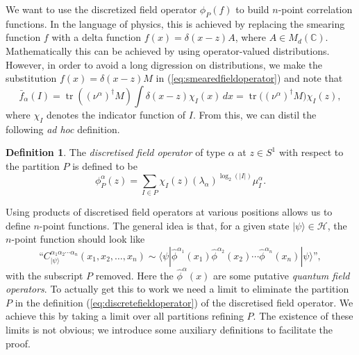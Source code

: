 \documentclass[11pt,oneside]{amsart}
\DeclareMathOperator{\tr}{tr}
\theoremstyle{plain}%
\theoremstyle{definition}
\newtheorem{definition}{Definition}[section]
\theoremstyle{remark}
\begin{document}
We want to use the discretized field operator $\phi_P(f)$ to build $n$-point correlation functions. In the language of physics, this is achieved by replacing the smearing function $f$ with a delta function $f(x)=\delta(x-z)A$, where $A\in M_d(\mathbb{C})$. Mathematically this can be achieved by using operator-valued distributions. However, in order to avoid a long digression on distributions, we make the substitution $f(x)=\delta(x-z)M$ in (\ref{eq:smearedfieldoperator}) and note that
\begin{equation}
	\bar{f}_\alpha(I) = \tr\left((\nu^\alpha)^\dag M\right)\int \delta(x-z)\chi_I(x)\, dx = \tr\bigl((\nu^\alpha)^\dag M\bigr)\chi_I(z),
\end{equation}
where $\chi_I$ denotes the indicator function of $I$.
From this, we can distil the following \emph{ad hoc} definition.

\begin{definition}
	The \emph{discretised field operator} of type $\alpha$ at $z\in S^1$ with respect to the partition $P$ is defined to be
	\begin{equation}\label{eq:discretefieldoperator}
		\phi_{{P}}^\alpha(z) = \sum_{I\in {P}} \chi_I(z) (\lambda_\alpha)^{\log_2(|I|)}\mu_I^\alpha.
	\end{equation}
\end{definition}

Using products of discretised field operators at various positions allows us to define $n$-point functions. The general idea is that, for a given state $|\psi\rangle \in\mathcal{H}$, the $n$-point function should look like
\begin{equation}
	\text{``}C_{|\psi\rangle}^{\alpha_1\alpha_2\cdots\alpha_n}(x_1, x_2, \ldots, x_n) \sim \langle \psi|\hat{\phi}^{\alpha_1}(x_1)\hat{\phi}^{\alpha_2}(x_2)\cdots \hat{\phi}^{\alpha_n}(x_n)|\psi\rangle\text{''},
\end{equation}
with the subscript $P$ removed. Here the $\hat{\phi}^\alpha(x)$ are some putative \emph{quantum field operators}. To actually get this to work we need a limit to eliminate the partition $P$ in the definition (\ref{eq:discretefieldoperator}) of the discretised field operator. We achieve this by taking a limit over all partitions refining $P$. The existence of these limits is not obvious; we introduce some auxiliary definitions to facilitate the proof.
\end{document}
